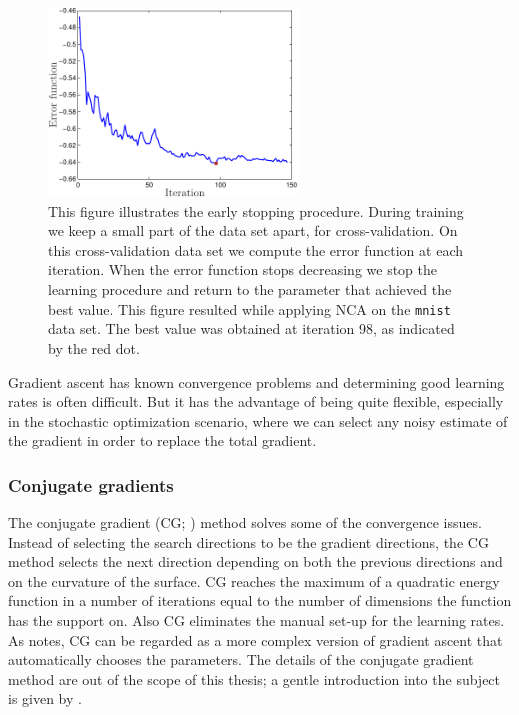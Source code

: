 	\begin{figure}
	 \centering\includegraphics[width=0.59\textwidth]{images/early-stopping}
	 \caption[Illustration of the ``early-stopping'' technique]{This figure illustrates the early stopping procedure. During training we keep a small part of the data set apart, for cross-validation. On this cross-validation data set we compute the error function at each iteration. When the error function stops decreasing we stop the learning procedure and return to the parameter that achieved the best value. This figure resulted while applying NCA on the \texttt{mnist} data set. The best value was obtained at iteration 98, as indicated by the red dot.}
	 \label{fig:early-stopping}
	\end{figure}


	Gradient ascent has known convergence problems and determining good learning rates is often difficult. But it has the advantage of being quite flexible, especially in the stochastic optimization scenario, where we can select any noisy estimate of the gradient in order to replace the total gradient.

	\subsubsection*{Conjugate gradients}
	
	The conjugate gradient (CG; \citealp{hestenes1952}) method solves some of the convergence issues. Instead of selecting the search directions to be the gradient directions, the CG method selects the next direction depending on both the previous directions and on the curvature of the surface. CG reaches the maximum of a quadratic energy function in a number of iterations equal to the number of dimensions the function has the support on. Also CG eliminates the manual set-up for the learning rates. As \citet{bishop1995} notes, CG can be regarded as a more complex version of gradient ascent that automatically chooses the parameters. The details of the conjugate gradient method are out of the scope of this thesis; a gentle introduction into the subject is given by \citet{shewchuk1994}.

